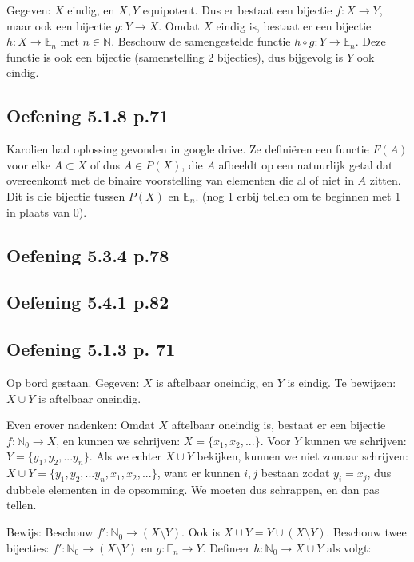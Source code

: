 \documentclass{article}
\begin{document}
Gegeven: $X$ eindig, en $X,Y$ equipotent. 
Dus er bestaat een bijectie $f:X \rightarrow Y$, maar ook een bijectie $g:Y \rightarrow X$. Omdat $X$ eindig is, bestaat er een bijectie $h:X \rightarrow \mathbb{E}_n$ met $n \in \mathbb{N}$. 
Beschouw de samengestelde functie $h \circ g:Y \rightarrow \mathbb{E}_n$. Deze functie is ook een bijectie (samenstelling 2 bijecties), dus bijgevolg is $Y$ ook eindig. 

\subsection{Oefening 5.1.8 p.71}

Karolien had oplossing gevonden in google drive. Ze defini\"eren een functie $F(A)$ voor elke $A \subset X$ of dus $A \in P(X)$, die $A$ afbeeldt op een natuurlijk getal dat overeenkomt met de binaire voorstelling van elementen die al of niet in $A$ zitten. Dit is die bijectie tussen $P(X)$ en $\mathbb{E}_n$. (nog 1 erbij tellen om te beginnen met 1 in plaats van 0).  

\subsection{Oefening 5.3.4 p.78}



\subsection{Oefening 5.4.1 p.82}


\subsection{Oefening 5.1.3 p. 71} 
Op bord gestaan. 
Gegeven: $X$ is aftelbaar oneindig, en $Y$ is eindig. Te bewijzen: $X \cup Y$ is aftelbaar oneindig. 

Even erover nadenken: 
Omdat $X$ aftelbaar oneindig is, bestaat er een bijectie $f: \mathbb{N}_0 \rightarrow X$, en kunnen we schrijven: $X=\{ x_1, x_2, ... \}$. Voor $Y$ kunnen we schrijven: $Y=\{ y_1, y_2, ... y_n \}$. 
Als we echter $X \cup Y$ bekijken, kunnen we niet zomaar schrijven: $X \cup Y = \{ y_1, y_2, ... y_n, x_1, x_2, ...\} $, want er kunnen $i,j$ bestaan zodat $y_i = x_j$, dus dubbele elementen in de opsomming. 
We moeten dus schrappen, en dan pas tellen. 

Bewijs: 
Beschouw $f': \mathbb{N}_0 \rightarrow (X \setminus Y)$. Ook is $X \cup Y = Y \cup (X \setminus Y)$. Beschouw twee bijecties: $f':  \mathbb{N}_0 \rightarrow (X \setminus Y)$ en $g: \mathbb{E}_n \rightarrow Y$. Defineer $h: \mathbb{N}_0 \rightarrow X \cup Y$ als volgt: 
\end{document}
